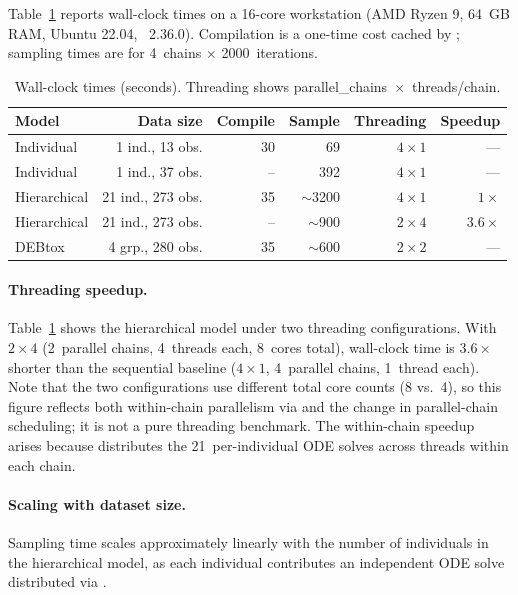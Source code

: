 \documentclass[article,shortnames]{jss}
\begin{document}
Table~\ref{tab:runtime} reports wall-clock times on a 16-core
workstation (AMD Ryzen 9, 64~GB RAM, Ubuntu 22.04, ~2.36.0).
Compilation is a one-time cost cached by ; sampling
times are for 4~chains $\times$ 2000~iterations.

\begin{table}[t!]
\centering
\caption{Wall-clock times (seconds).  Threading shows
  parallel\_chains~$\times$~threads/chain.}
\label{tab:runtime}
\begin{tabular}{lrrrrr}
\toprule
Model & Data size & Compile & Sample & Threading & Speedup \\
\midrule
Individual     & 1 ind., 13 obs.    & 30 & 69   & $4 \times 1$ & --- \\
Individual     & 1 ind., 37 obs.    & -- & 392  & $4 \times 1$ & --- \\
Hierarchical   & 21 ind., 273 obs.  & 35 & $\sim$3200 & $4 \times 1$ & $1\times$ \\
Hierarchical   & 21 ind., 273 obs.  & -- & $\sim$900  & $2 \times 4$ & $3.6\times$ \\
DEBtox         & 4 grp., 280 obs.   & 35 & $\sim$600  & $2 \times 2$ & --- \\
\bottomrule
\end{tabular}
\end{table}


\paragraph{Threading speedup.}
Table~\ref{tab:runtime} shows the hierarchical model under two
threading configurations.  With $2 \times 4$ (2~parallel chains,
4~threads each, 8~cores total), wall-clock time is $3.6\times$
shorter than the sequential baseline ($4 \times 1$, 4~parallel
chains, 1~thread each).  Note that the two configurations use
different total core counts (8 vs.\ 4), so this figure reflects
both within-chain parallelism via  and the
change in parallel-chain scheduling; it is not a pure threading
benchmark.  The within-chain speedup arises because
 distributes the 21~per-individual ODE solves
across threads within each chain.

\paragraph{Scaling with dataset size.}
Sampling time scales approximately linearly with the number of
individuals in the hierarchical model, as each individual contributes
an independent ODE solve distributed via .
\end{document}
